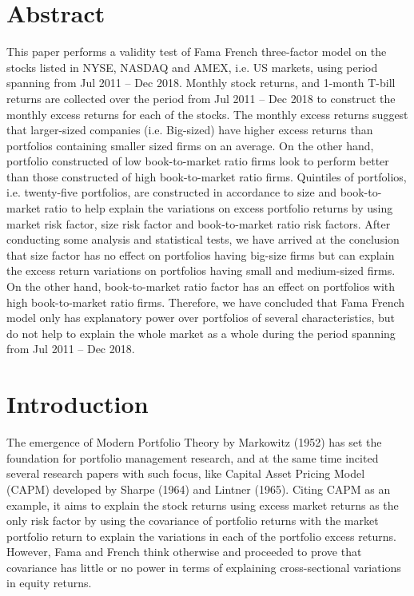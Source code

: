 \documentclass[12pt]{article}
\begin{document}
		\section{Abstract} %
	
	This paper performs a validity test of Fama French three-factor model on the stocks listed in NYSE, NASDAQ and AMEX, i.e. US markets, using period spanning from Jul 2011 – Dec 2018. Monthly stock returns, and 1-month T-bill returns are collected over the period from Jul 2011 – Dec 2018 to construct the monthly excess returns for each of the stocks. The monthly excess returns suggest that larger-sized companies (i.e. Big-sized) have higher excess returns than portfolios containing smaller sized firms on an average. On the other hand, portfolio constructed of low book-to-market ratio firms look to perform better than those constructed of high book-to-market ratio firms. Quintiles of portfolios, i.e. twenty-five portfolios, are constructed in accordance to size and book-to-market ratio to help explain the variations on excess portfolio returns by using market risk factor, size risk factor and book-to-market ratio risk factors. After conducting some analysis and statistical tests, we have arrived at the conclusion that size factor has no effect on portfolios having big-size firms but can explain the excess return variations on portfolios having small and medium-sized firms. On the other hand, book-to-market ratio factor has an effect on portfolios with high book-to-market ratio firms. Therefore, we have concluded that Fama French model only has explanatory power over portfolios of several characteristics, but do not help to explain the whole market as a whole during the period spanning from Jul 2011 – Dec 2018.
	
	
	\section{Introduction} %
	
	The emergence of Modern Portfolio Theory by Markowitz (1952) has set the foundation for portfolio management research, and at the same time incited several research papers with such focus, like Capital Asset Pricing Model (CAPM) developed by Sharpe (1964) and Lintner (1965). Citing CAPM as an example, it aims to explain the stock returns using excess market returns as the only risk factor by using the covariance of portfolio returns with the market portfolio return to explain the variations in each of the portfolio excess returns. However, Fama and French think otherwise and proceeded to prove that covariance has little or no power in terms of explaining cross-sectional variations in equity returns. \\
	
\end{document}
